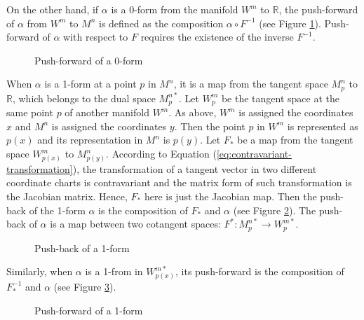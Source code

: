 \documentclass[11pt, a4paper]{book}
\begin{document}
On the other hand, if $\alpha$ is a 0-form from the manifold $W^m$ to $\mathbb{R}$, the
push-forward of $\alpha$ from $W^m$ to $M^n$ is defined as the composition
$\alpha \circ F^{-1}$ (see Figure \ref{fig:push-forward-0-form}). Push-forward of $\alpha$
with respect to $F$ requires the existence of the inverse $F^{-1}$.
\begin{figure}[htbp]
  \centering
  \caption{Push-forward of a 0-form}
  \label{fig:push-forward-0-form}
\end{figure}

When $\alpha$ is a 1-form at a point $p$ in $M^n$, it is a map from the tangent space
$M_p^n$ to $\mathbb{R}$, which belongs to the dual space $M_p^{n*}$. Let $W_p^m$ be the
tangent space at the same point $p$ of another manifold $W^m$. As above, $W^m$ is assigned
the coordinates $x$ and $M^n$ is assigned the coordinates $y$. Then the point $p$ in $W^m$
is represented as $p(x)$ and its representation in $M^n$ is $p(y)$. Let $F_{*}$ be a map
from the tangent space $W_{p(x)}^m$ to $M_{p(y)}^n$. According to Equation
(\ref{eq:contravariant-transformation}), the transformation of a tangent vector in two
different coordinate charts is contravariant and the matrix form of such transformation is
the Jacobian matrix. Hence, $F_{*}$ here is just the Jacobian map. Then the push-back of
the 1-form $\alpha$ is the composition of $F_{*}$ and $\alpha$ (see Figure
\ref{fig:push-back-1-form}). The push-back of $\alpha$ is a map between two cotangent
spaces: $F^{*}: M_p^{n*} \rightarrow W_p^{m*}$.

\begin{figure}[htbp]
  \centering
  \caption{Push-back of a 1-form}
  \label{fig:push-back-1-form}
\end{figure}

Similarly, when $\alpha$ is a 1-from in $W_{p(x)}^{m*}$, its push-forward is the
composition of $F_{*}^{-1}$ and $\alpha$ (see Figure \ref{fig:push-forward-1-form}).

\begin{figure}[htbp]
  \centering
  \caption{Push-forward of a 1-form}
  \label{fig:push-forward-1-form}
\end{figure}
\end{document}
